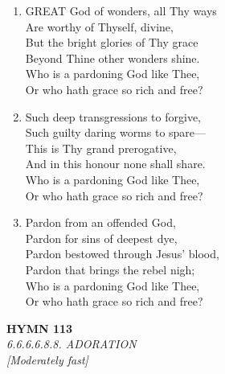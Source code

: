 \documentclass[11pt,a4paper]{article}
\begin{document}
\begin{enumerate}
    \item GREAT God of wonders, all Thy ways \\
        Are worthy of Thyself, divine, \\
        But the bright glories of Thy grace \\
        Beyond Thine other wonders shine. \\
        Who is a pardoning God like Thee, \\
        Or who hath grace so rich and free?

    \item Such deep transgressions to forgive, \\
        Such guilty daring worms to spare--- \\
        This is Thy grand prerogative, \\
        And in this honour none shall share. \\
        Who is a pardoning God like Thee, \\
        Or who hath grace so rich and free?

    \item Pardon from an offended God, \\
        Pardon for sins of deepest dye, \\
        Pardon bestowed through Jesus' blood, \\
        Pardon that brings the rebel nigh; \\
        Who is a pardoning God like Thee, \\
        Or who hath grace so rich and free?

\end{enumerate}

\newpage
\begin{center}
    {\Large \textbf{HYMN 113}}
    \\
    \textit{6.6.6.6.8.8. ADORATION}
    \\
    \textit{\small [Moderately fast]}
\end{center}
\vspace{1em}
\end{document}
